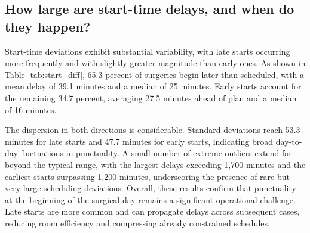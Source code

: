 \documentclass[
]{article}
\begin{document}
\subsection{How large are start-time delays, and when do they
happen?}\label{how-large-are-start-time-delays-and-when-do-they-happen}

Start-time deviations exhibit substantial variability, with late starts
occurring more frequently and with slightly greater magnitude than early
ones. As shown in Table \ref{tab:start_diff}, 65.3 percent of surgeries
begin later than scheduled, with a mean delay of 39.1 minutes and a
median of 25 minutes. Early starts account for the remaining 34.7
percent, averaging 27.5 minutes ahead of plan and a median of 16
minutes.

The dispersion in both directions is considerable. Standard deviations
reach 53.3 minutes for late starts and 47.7 minutes for early starts,
indicating broad day-to-day fluctuations in punctuality. A small number
of extreme outliers extend far beyond the typical range, with the
largest delays exceeding 1,700 minutes and the earliest starts
surpassing 1,200 minutes, underscoring the presence of rare but very
large scheduling deviations. Overall, these results confirm that
punctuality at the beginning of the surgical day remains a significant
operational challenge. Late starts are more common and can propagate
delays across subsequent cases, reducing room efficiency and compressing
already constrained schedules.
\end{document}
